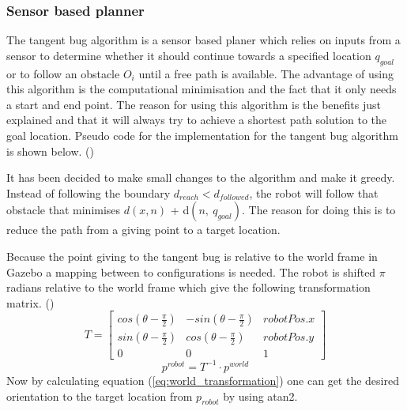 \documentclass[../Head/Main.tex]{subfiles}
\begin{document}
\subsubsection{Sensor based planner}
The tangent bug algorithm is a sensor based planer which relies on inputs from a sensor to determine whether it should continue towards a  specified location $q_{goal}$ or to follow an obstacle $O_i$ until a free path is available. The advantage of using this algorithm is the computational minimisation and the fact that it only needs a start and end point. The reason for using this algorithm is the benefits just explained and that it will always try to achieve a shortest path solution to the goal location. Pseudo code for the implementation for the tangent bug algorithm is shown below. (\cite[23-37]{ROB})    

It has been decided to make small changes to the algorithm and make it greedy. Instead of following the boundary $d_{reach} < d_{followed}$, the robot will follow that obstacle that minimises ${d(x,n)}$ + d$\left(n,~q_{goal}\right)$. The reason for doing this is to reduce the path from a giving point to a target location. \par
Because the point giving to the tangent bug is relative to the world frame in Gazebo a mapping between to configurations is needed. The robot is shifted $\pi$ radians relative to the world frame which give the following transformation matrix. (\cite[60-66]{ROB})
\begin{equation}
	T = \begin{bmatrix} 
	   cos(\theta-\frac{\pi}{2}) &  -sin(\theta-\frac{\pi}{2}) & robotPos.x \\ 
	    sin(\theta-\frac{\pi}{2}) &  cos(\theta-\frac{\pi}{2}) & robotPos.y \\
	    0 & 0 & 1					
	\end{bmatrix}
\end{equation}
\begin{equation}\label{eq:world_transformation}
	p^{robot} = T^{-1} \cdot {p^{world}}
\end{equation}	
Now by calculating equation (\ref{eq:world_transformation}) one can get the desired orientation to the target location from $p_{robot}$ by using atan2.
\end{document}
